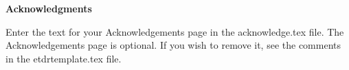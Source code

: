 
\newpage
\vspace*{0.9cm}
\begin{center}
{\bf \Huge Acknowledgments}
\end{center}

\setlength{\baselineskip}{0.8cm}



Enter the text for your Acknowledgements page in the acknowledge.tex file. The Acknowledgements page is optional.  If you wish to remove it, see the comments in the etdrtemplate.tex file.
